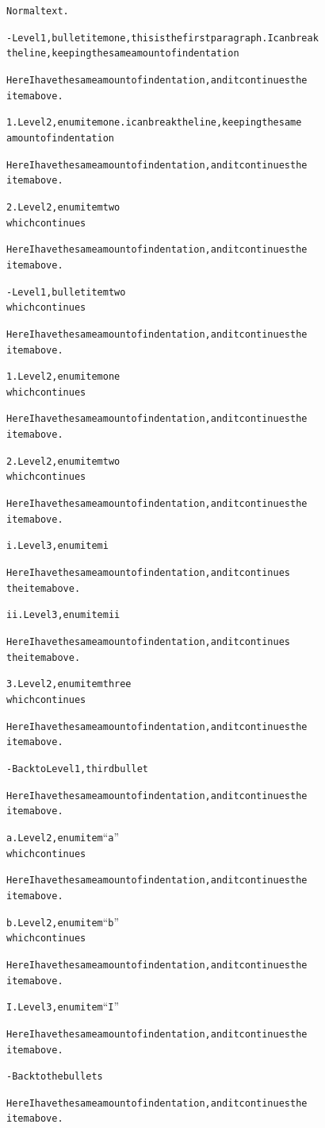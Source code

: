 \documentclass[DIV=12,%
               BCOR=0mm,%
               fontsize=10pt,%
               oneside,%
               paper=210mm:11in]{scrbook}
\begin{document}
\begin{alltt}
Normal text.

 - Level 1, bullet item one, this is the first paragraph. I can break
   the line, keeping the same amount of indentation

   Here I have the same amount of indentation, and it continues the
   item above.

   1. Level 2, enum item one. i can break the line, keeping the same
      amount of indentation

      Here I have the same amount of indentation, and it continues the
      item above.

   2. Level 2, enum item two
      which continues

      Here I have the same amount of indentation, and it continues the
      item above.

 - Level 1, bullet item two
   which continues

   Here I have the same amount of indentation, and it continues the
   item above.

   1. Level 2, enum item one
      which continues

      Here I have the same amount of indentation, and it continues the
      item above.

   2. Level 2, enum item two
      which continues

      Here I have the same amount of indentation, and it continues the
      item above.

      i.  Level 3, enum item i

          Here I have the same amount of indentation, and it continues
          the item above.

      ii. Level 3, enum item ii

          Here I have the same amount of indentation, and it continues
          the item above.

   3. Level 2, enum item three
      which continues

      Here I have the same amount of indentation, and it continues the
      item above.

 - Back to Level 1, third bullet

   Here I have the same amount of indentation, and it continues the
   item above.

   a. Level 2, enum item “a”
      which continues

      Here I have the same amount of indentation, and it continues the
      item above.

   b. Level 2, enum item “b”
      which continues

      Here I have the same amount of indentation, and it continues the
      item above.

         I. Level 3, enum item “I”

            Here I have the same amount of indentation, and it continues the
            item above.

 - Back to the bullets

   Here I have the same amount of indentation, and it continues the
   item above.


\end{alltt}
\end{document}
